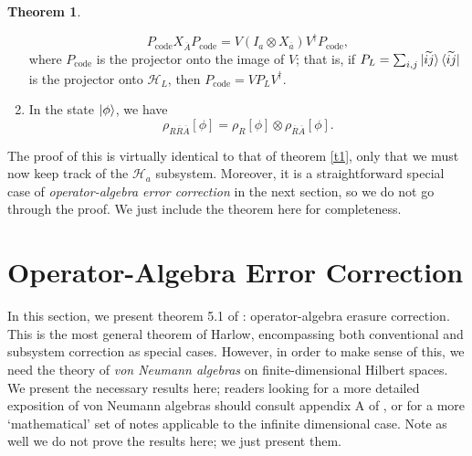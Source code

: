 \documentclass[12pt,a4paper]{report}
\numberwithin{equation}{section}
\newcommand{\ketbra}[2]{\ket{#1}\bra{#2}}
\newcommand{\ketbras}[1]{\ketbra{#1}{#1}}
\newcommand{\Pc}{P_{\text{code}}}
\newcommand{\ol}[1]{\overline{#1}}
\theoremstyle{definition}
\theoremstyle{theorem}
\newtheorem{theorem}{Theorem}[section]
\theoremstyle{theorem}
\theoremstyle{example}
\theoremstyle{definition}
\begin{document}
\begin{theorem}
\begin{enumerate}
		\begin{equation}\label{S3}
			\Pc X_{\ol{A}}\Pc=V(I_{a}\otimes X_{\ol{a}})V^{\dagger}\Pc,
		\end{equation}
		where $\Pc$ is the projector onto the image of $V$; that is, if $P_{L}=\sum_{i,j}\ketbras{\widetilde{ij}}$ is the projector onto $\mathcal{H}_{L}$, then $\Pc=VP_{L}V^{\dagger}$.
		\item In the state $\ket{\phi}$, we have
		\begin{equation}\label{S4}
			\rho_{R\ol{R}\ol{A}}[\phi]=\rho_{R}[\phi]\otimes\rho_{\ol{R}\ol{A}}[\phi].
		\end{equation}
	\end{enumerate}
\end{theorem}
The proof of this is virtually identical to that of theorem \ref{t1}, only that we must now keep track of the $\mathcal{H}_{a}$ subsystem. Moreover, it is a straightforward special case of \textit{operator-algebra error correction} in the next section, so we do not go through the proof. We just include the theorem here for completeness.

\section{Operator-Algebra Error Correction}
In this section, we present theorem 5.1 of \cite{Harlow}: operator-algebra erasure correction. This is the most general theorem of Harlow, encompassing both conventional and subsystem correction as special cases. However, in order to make sense of this, we need the theory of \textit{von Neumann algebras} on finite-dimensional Hilbert spaces. We present the necessary results here; readers looking for a more detailed exposition of von Neumann algebras should consult appendix A of \cite{Harlow}, or \cite{VNA} for a more `mathematical' set of notes applicable to the infinite dimensional case. Note as well we do not prove the results here; we just present them.
\end{document}
